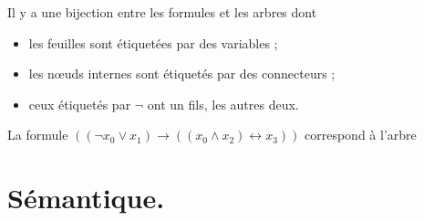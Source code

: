 \documentclass[./main]{subfiles}
\begin{document}
  \begin{crlr}
    Il y a une bijection entre les formules et les arbres dont
    \begin{itemize}
      \item les feuilles sont étiquetées par des variables ;
      \item les nœuds internes sont étiquetés par des connecteurs ;
      \item ceux étiquetés par $\lnot$ ont un fils, les autres deux.
    \end{itemize}
  \end{crlr}

  \begin{exm}
    La formule $((\lnot x_0 \lor x_1) \to ((x_0 \land x_2) \leftrightarrow x_3))$ correspond à l'arbre 
    \begin{figure}[H]
      \centering
    \end{figure}
  \end{exm}

  \section{Sémantique.}
  
\end{document}
